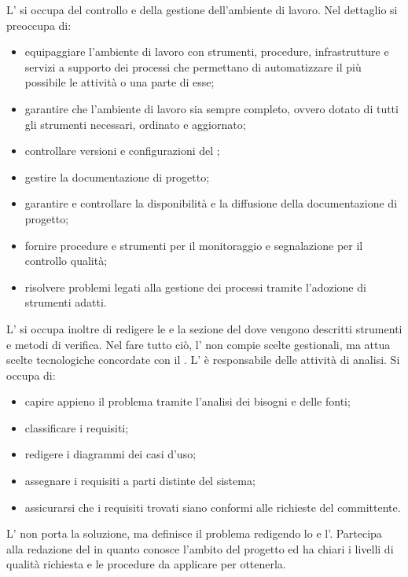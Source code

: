 				L' si occupa del controllo e della gestione dell'ambiente di lavoro. Nel dettaglio si preoccupa di:
				\begin{itemize}
					\item equipaggiare l'ambiente di lavoro con strumenti, procedure, infrastrutture e servizi a supporto dei processi che permettano di automatizzare il più possibile le attività o una parte di esse;
					\item garantire che l’ambiente di lavoro sia sempre completo, ovvero dotato di tutti gli strumenti necessari, ordinato e aggiornato;
					\item controllare versioni e configurazioni del ;
					\item gestire la documentazione di progetto;
					\item garantire e controllare la disponibilità e la diffusione della documentazione di progetto;
					\item fornire procedure e strumenti per il monitoraggio e segnalazione per il controllo qualità;
					\item risolvere problemi legati alla gestione dei processi tramite l'adozione di strumenti adatti.
				\end{itemize}
				L' si occupa inoltre di redigere le  e la sezione del  dove vengono descritti strumenti e metodi di verifica. Nel fare tutto ciò, l' non compie scelte gestionali, ma attua scelte tecnologiche concordate con il .
				L' è responsabile delle attività di analisi. Si occupa di:
				\begin{itemize}
					\item capire appieno il problema tramite l'analisi dei bisogni e delle fonti;
					\item classificare i requisiti;
					\item redigere i diagrammi dei casi d'uso;
					\item assegnare i requisiti a parti distinte del sistema;
					\item assicurarsi che i requisiti trovati siano conformi alle richieste del committente.
				\end{itemize}
				L' non porta la soluzione, ma definisce il problema redigendo lo  e l'. Partecipa alla redazione del  in quanto conosce l’ambito del progetto ed ha chiari i livelli di qualità richiesta e le procedure da applicare per ottenerla.
